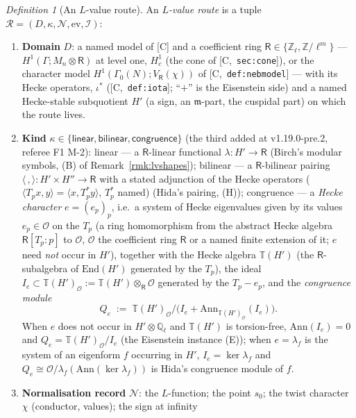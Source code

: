 \documentclass[11pt]{article}
\theoremstyle{remark}
\newtheorem{definition}[theorem]{Definition}
\newcommand{\Z}{\mathbb{Z}}
\newcommand{\Q}{\mathbb{Q}}
\newcommand{\Ga}{\Gamma}
\newcommand{\T}{\mathbb{T}}
\newcommand{\m}{\mathfrak{m}}
\newcommand{\Mn}{M_n}
\newcommand{\HA}[1]{[C,~\texttt{#1}]}      %
\begin{document}
\begin{definition}[An $L$-value route]\label{def:lvroute}
An \emph{$L$-value route} is a tuple $\mathcal R=(D,\kappa,\mathcal N,\mathrm{ev},\mathcal I)$:
\begin{enumerate}
\item \textbf{Domain} $D$: a named model of [C] and a coefficient ring $\mathsf R\in\{\Z_\ell,\Z/\ell^{m}\}$ --- $H^{1}(\Ga;\Mn\otimes\mathsf R)$ at level one, $H^{1}_c$ (the cone of
  \HA{sec:cone}), or the character model $H^{1}(\Ga_0(N);V_{\mathsf R}(\chi))$ of \HA{def:nebmodel} --- with its Hecke operators, $\iota^{\ast}$ (\HA{def:iota}; ``$+$'' is the
  Eisenstein side) and a named Hecke-stable subquotient $H'$ (a sign, an $\m$-part, the cuspidal part) on which the route lives.
\item \textbf{Kind} $\kappa\in\{\textsf{linear},\textsf{bilinear},\textsf{congruence}\}$ (the third added at v1.19.0-pre.2, referee F1 M-2):
  \textsf{linear} --- a $\mathsf R$-linear functional $\lambda\colon H'\to\mathsf R$ (Birch's modular symbols, (B) of Remark~\ref{rmk:lvshapes});
  \textsf{bilinear} --- a $\mathsf R$-bilinear pairing $\langle\,,\rangle\colon H'\times H''\to\mathsf R$ with a stated adjunction of the Hecke operators
  ($\langle T_px,y\rangle=\langle x,T_p^{\ast}y\rangle$, $T_p^{\ast}$ named) (Hida's pairing, (H));
  \textsf{congruence} --- a \emph{Hecke character} $e=(e_p)_p$, i.e.\ a system of Hecke eigenvalues given by its values $e_p\in\mathcal O$ on the $T_p$ (a ring homomorphism
  from the abstract Hecke algebra $\mathsf R[T_p:p]$ to $\mathcal O$, $\mathcal O$ the coefficient ring $\mathsf R$ or a named finite extension of it; $e$ need \emph{not} occur in $H'$),
  together with the Hecke algebra $\T(H')$ (the $\mathsf R$-subalgebra of $\mathrm{End}(H')$ generated by the $T_p$), the ideal $I_e\subset\T(H')_{\mathcal O}:=\T(H')\otimes_{\mathsf R}\mathcal O$
  generated by the $T_p-e_p$, and the \emph{congruence module}
  \[
    Q_e\;:=\;\T(H')_{\mathcal O}\big/\bigl(I_e+\mathrm{Ann}_{\T(H')_{\mathcal O}}(I_e)\bigr).
  \]
  When $e$ does not occur in $H'\otimes\Q_\ell$ and $\T(H')$ is torsion-free, $\mathrm{Ann}(I_e)=0$ and $Q_e=\T(H')_{\mathcal O}/I_e$ (the Eisenstein instance (E)); when
  $e=\lambda_f$ is the system of an eigenform $f$ occurring in $H'$, $I_e=\ker\lambda_f$ and $Q_e\cong\mathcal O/\lambda_f(\mathrm{Ann}(\ker\lambda_f))$ is Hida's congruence module of $f$.
\item \textbf{Normalisation record} $\mathcal N$: the $L$-function; the point $s_0$; the twist character $\chi$ (conductor, values); the sign at infinity

\end{enumerate}
\end{definition}
\end{document}
